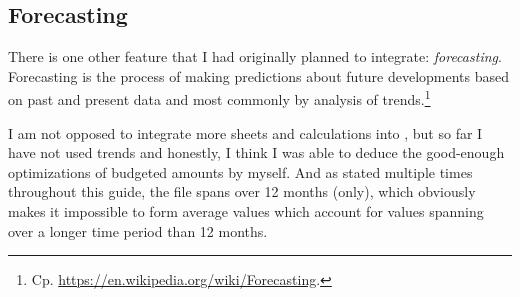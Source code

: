 \subsection{Forecasting}
\label{subsec:forecasting}

There is one other feature that I had originally planned to integrate: \emph{forecasting}.
Forecasting is the process of making predictions about future developments based on past and present data and most commonly by analysis of trends.\footnote{Cp. \href{https://en.wikipedia.org/wiki/Forecasting}{https://en.wikipedia.org/wiki/Forecasting}.}

I am not opposed to integrate more sheets and calculations into \tfn, but so far I have not used trends and honestly, I think I was able to deduce the good-enough optimizations of budgeted amounts by myself.
And as stated multiple times throughout this guide, the file spans over 12 months (only), which obviously makes it impossible to form average values which account for values spanning over a longer time period than 12 months.